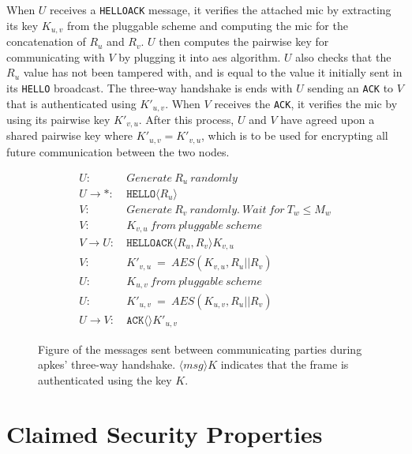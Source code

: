 When $U$ receives a \texttt{HELLOACK} message, it verifies the attached \gls{mic} by extracting its key $K_{u,v}$ from the pluggable scheme and computing the \gls{mic} for the concatenation of $R_u$ and $R_v$. $U$ then computes the pairwise key for communicating with $V$ by plugging it into \gls{aes} algorithm. $U$ also checks that the $R_u$ value has not been tampered with, and is equal to the value it initially sent in its \texttt{HELLO} broadcast. The three-way handshake is ends with $U$ sending an \texttt{ACK} to $V$ that is authenticated using $K'_{u,v}$. When $V$ receives the \texttt{ACK}, it verifies the \gls{mic} by using its pairwise key $K'_{v,u}$. After this process, $U$ and $V$ have agreed upon a shared pairwise key where $K'_{u,v} = K'_{v,u}$, which is to be used for encrypting all future communication between the two nodes.




\begin{figure}[h]
\begin{tcolorbox}[title=Three-way handshake in APKES]
\begin{align*}
U:\ & Generate\ R_u\ randomly\\
U \rightarrow *:\ & \texttt{HELLO}\langle{R_u}\rangle{}\\
V:\ & Generate\ R_v\ randomly.\ Wait\ for\ T_w \leq M_w\\
V:\ & K_{v,u}\ from\ pluggable\ scheme\\
V \rightarrow U:\ & \texttt{HELLOACK}\langle{R_u, R_v}\rangle{K_{v,u}}\\
V:\ & K'_{v,u}\ =\ AES(K_{v,u}, R_u || R_v)\\
U:\ & K_{u,v}\ from\ pluggable\ scheme\\
U:\ & K'_{u,v}\ =\ AES(K_{u,v}, R_u || R_v)\\
U \rightarrow V:\ & \texttt{ACK}\langle{}\rangle{K'_{u,v}}
\end{align*}
\end{tcolorbox}
\caption{Figure of the messages sent between communicating parties during \gls{apkes}' three-way handshake. $\langle{msg}\rangle{K}$ indicates that the frame is authenticated using the key $K$.}
\label{fig:apkes-handshake}
\end{figure}

\newpage

\section{Claimed Security Properties}

